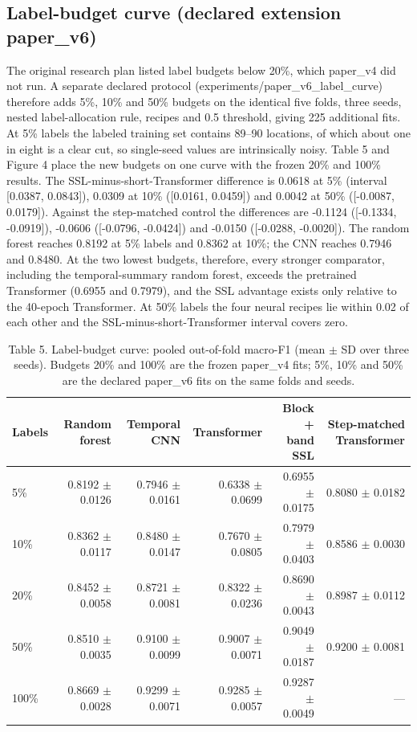 \documentclass[11pt,a4paper]{article}
\begin{document}
\subsection{Label-budget curve (declared extension paper\_v6)}
The original research plan listed label budgets below 20\%, which paper\_v4 did not run. A separate declared protocol (experiments/paper\_v6\_label\_curve) therefore adds 5\%, 10\% and 50\% budgets on the identical five folds, three seeds, nested label-allocation rule, recipes and 0.5 threshold, giving 225 additional fits. At 5\% labels the labeled training set contains 89--90 locations, of which about one in eight is a clear cut, so single-seed values are intrinsically noisy. Table 5 and Figure 4 place the new budgets on one curve with the frozen 20\% and 100\% results. The SSL-minus-short-Transformer difference is 0.0618 at 5\% (interval [0.0387, 0.0843]), 0.0309 at 10\% ([0.0161, 0.0459]) and 0.0042 at 50\% ([-0.0087, 0.0179]). Against the step-matched control the differences are -0.1124 ([-0.1334, -0.0919]), -0.0606 ([-0.0796, -0.0424]) and -0.0150 ([-0.0288, -0.0020]). The random forest reaches 0.8192 at 5\% labels and 0.8362 at 10\%; the CNN reaches 0.7946 and 0.8480. At the two lowest budgets, therefore, every stronger comparator, including the temporal-summary random forest, exceeds the pretrained Transformer (0.6955 and 0.7979), and the SSL advantage exists only relative to the 40-epoch Transformer. At 50\% labels the four neural recipes lie within 0.02 of each other and the SSL-minus-short-Transformer interval covers zero.

\begin{table}[htbp]
\centering
\small
\caption{Table 5. Label-budget curve: pooled out-of-fold macro-F1 (mean $\pm$ SD over three seeds). Budgets 20\% and 100\% are the frozen paper\_v4 fits; 5\%, 10\% and 50\% are the declared paper\_v6 fits on the same folds and seeds.}
\begin{tabular}{lrrrrr}
\toprule
Labels & Random forest & Temporal CNN & Transformer & Block + band SSL & Step-matched Transformer \\ \midrule
5\% & 0.8192 $\pm$ 0.0126 & 0.7946 $\pm$ 0.0161 & 0.6338 $\pm$ 0.0699 & 0.6955 $\pm$ 0.0175 & 0.8080 $\pm$ 0.0182 \\
10\% & 0.8362 $\pm$ 0.0117 & 0.8480 $\pm$ 0.0147 & 0.7670 $\pm$ 0.0805 & 0.7979 $\pm$ 0.0403 & 0.8586 $\pm$ 0.0030 \\
20\% & 0.8452 $\pm$ 0.0058 & 0.8721 $\pm$ 0.0081 & 0.8322 $\pm$ 0.0236 & 0.8690 $\pm$ 0.0043 & 0.8987 $\pm$ 0.0112 \\
50\% & 0.8510 $\pm$ 0.0035 & 0.9100 $\pm$ 0.0099 & 0.9007 $\pm$ 0.0071 & 0.9049 $\pm$ 0.0187 & 0.9200 $\pm$ 0.0081 \\
100\% & 0.8669 $\pm$ 0.0028 & 0.9299 $\pm$ 0.0071 & 0.9285 $\pm$ 0.0057 & 0.9287 $\pm$ 0.0049 & --- \\
\bottomrule
\end{tabular}
\end{table}
\end{document}
